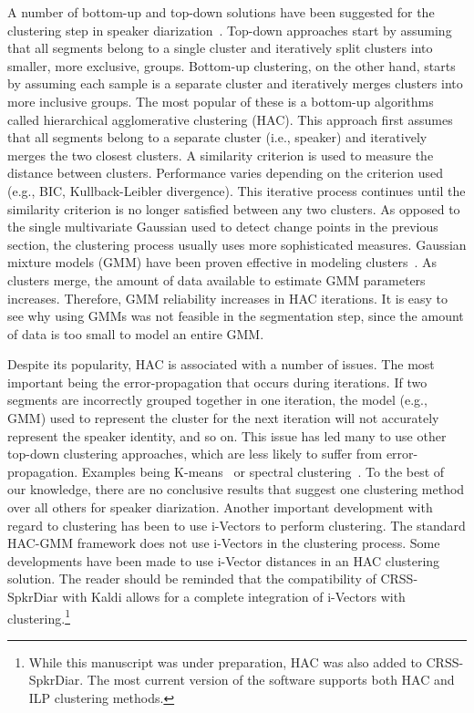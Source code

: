 A number of bottom-up and top-down solutions have been suggested for the clustering step in speaker diarization~\cite{tranterreynolds2006drzoverview,anguera2012diarization}. 
Top-down approaches start by assuming that all segments belong to a single cluster and iteratively split clusters into smaller, more exclusive, groups. 
Bottom-up clustering, on the other hand, starts by assuming each sample is a separate cluster and iteratively merges clusters into more inclusive groups. 
The most popular of these is a bottom-up algorithms called hierarchical agglomerative clustering (HAC). 
This approach first assumes that all segments belong to a separate cluster (i.e., speaker) and iteratively merges the two closest clusters. 
A similarity criterion is used to measure the distance between clusters. 
Performance varies depending on the criterion used (e.g., BIC, Kullback-Leibler divergence). 
This iterative process continues until the similarity criterion is no longer satisfied between any two clusters. 
As opposed to the single multivariate Gaussian used to detect change points in the previous section, the clustering process usually uses more sophisticated measures. 
Gaussian mixture models (GMM) have been proven effective in modeling clusters~\cite{zelenak2010albayzin}. 
As clusters merge, the amount of data available to estimate GMM parameters increases. 
Therefore, GMM reliability increases in HAC iterations. 
It is easy to see why using GMMs was not feasible in the segmentation step, since the amount of data is too small to model an entire GMM. 

Despite its popularity, HAC is associated with a number of issues. 
The most important being the error-propagation that occurs during iterations. 
If two segments are incorrectly grouped together in one iteration, the model (e.g., GMM) used to represent the cluster for the next iteration will not accurately represent the speaker identity, and so on. 
This issue has led many to use other top-down clustering approaches, which are less likely to suffer from error-propagation. Examples being K-means~\cite{shum2011exploiting} or spectral clustering~\cite{shum2012spectralclustering, ning2006spectral}. 
To the best of our knowledge, there are no conclusive results that suggest one clustering method over all others for speaker diarization. 
Another important development with regard to clustering has been to use i-Vectors to perform clustering. 
The standard HAC-GMM framework does not use i-Vectors in the clustering process. 
Some developments have been made to use i-Vector distances in an HAC clustering solution. 
The reader should be reminded that the compatibility of CRSS-SpkrDiar with Kaldi allows for a complete integration of i-Vectors with clustering.\footnote{While this manuscript was under preparation, HAC was also added to CRSS-SpkrDiar. The most current version of the software supports both HAC and ILP clustering methods.} 

